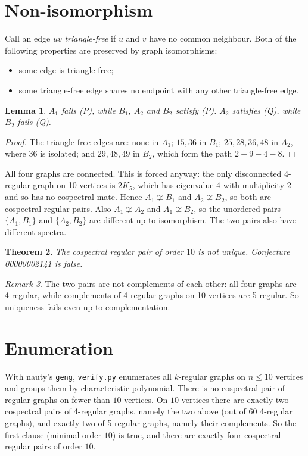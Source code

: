 \documentclass[11pt]{article}
\newtheorem{theorem}{Theorem}
\newtheorem{lemma}[theorem]{Lemma}
\theoremstyle{remark}
\newtheorem{remark}[theorem]{Remark}
\begin{document}
\section{Non-isomorphism}
Call an edge $uv$ \emph{triangle-free} if $u$ and $v$ have no common
neighbour. Both of the following properties are preserved by graph
isomorphisms:
\begin{itemize}
\item[(P)] some edge is triangle-free;
\item[(Q)] some triangle-free edge shares no endpoint with any other
triangle-free edge.
\end{itemize}
\begin{lemma}
$A_1$ fails (P), while $B_1$, $A_2$ and $B_2$ satisfy (P). $A_2$ satisfies (Q),
while $B_2$ fails (Q).
\end{lemma}
\begin{proof}
The triangle-free edges are: none in $A_1$; $15,36$ in $B_1$; $25,28,36,48$ in
$A_2$, where $36$ is isolated; and $29,48,49$ in $B_2$, which form the path
$2\!-\!9\!-\!4\!-\!8$.
\end{proof}
All four graphs are connected. This is forced anyway: the only
disconnected 4-regular graph on 10 vertices is $2K_5$, which has eigenvalue $4$
with multiplicity $2$ and so has no cospectral mate. Hence $A_1\not\cong B_1$ and $A_2\not\cong B_2$, so both are cospectral regular
pairs. Also $A_1\not\cong A_2$ and $A_1\not\cong B_2$, so the unordered pairs
$\{A_1,B_1\}$ and $\{A_2,B_2\}$ are different up to isomorphism. The two pairs
also have different spectra.

\begin{theorem}
The cospectral regular pair of order $10$ is not unique. Conjecture 00000002141
is false.
\end{theorem}

\begin{remark}
The two pairs are not complements of each other: all four graphs are
4-regular, while complements of 4-regular graphs on 10 vertices are 5-regular.
So uniqueness fails even up to complementation.
\end{remark}

\section{Enumeration}\label{sec:enum}
With nauty's \texttt{geng}, \texttt{verify.py} enumerates all $k$-regular graphs
on $n\le10$ vertices and groups them by characteristic polynomial. There is
no cospectral pair of regular graphs on fewer than $10$ vertices. On $10$
vertices there are exactly two cospectral pairs of 4-regular graphs, namely the
two above (out of $60$ 4-regular graphs), and exactly two of 5-regular graphs,
namely their complements. So the first clause (minimal order $10$) is true, and
there are exactly four cospectral regular pairs of order $10$.
\end{document}
